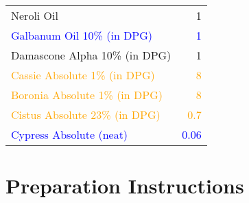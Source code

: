 \documentclass{article}
\begin{document}
\begin{table}[h]
\begin{tabular}{lr}
Neroli Oil & 1 \\
\textcolor{blue}{Galbanum Oil 10\% (in DPG)} & \textcolor{blue}{1} \\
Damascone Alpha 10\% (in DPG) & 1 \\
\textcolor{orange}{Cassie Absolute 1\% (in DPG)} & \textcolor{orange}{8} \\
\textcolor{orange}{Boronia Absolute 1\% (in DPG)} & \textcolor{orange}{8} \\
\textcolor{orange}{Cistus Absolute 23\% (in DPG)} & \textcolor{orange}{0.7} \\
\textcolor{blue}{Cypress Absolute (neat)} & \textcolor{blue}{0.06} \\
\bottomrule
\end{tabular}
\end{table}

\section{Preparation Instructions}
\end{document}
